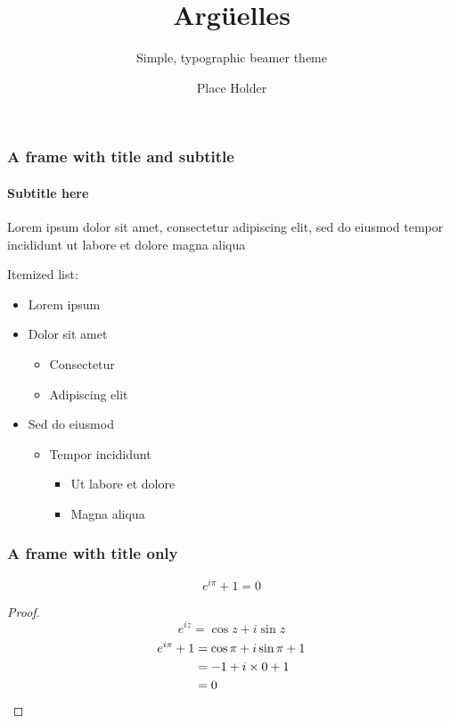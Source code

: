 \documentclass[compress,12pt]{beamer}
\title{Argüelles}
\subtitle{Simple, typographic beamer theme}
\date{}
\author{Place Holder}
\institute{University of \TeX}
\begin{document}
\frame[plain]{\titlepage}


\begin{frame}
 \frametitle{A frame with title and subtitle}
      \framesubtitle{Subtitle here}
      Lorem ipsum dolor sit amet, consectetur adipiscing elit, sed do eiusmod tempor incididunt ut labore et dolore magna aliqua \par
      Itemized list:
 \begin{itemize}
            \item Lorem ipsum
            \item Dolor sit amet
        \begin{itemize}
                        \item Consectetur
                        \item Adipiscing elit
                  \end{itemize}
            \item Sed do eiusmod
               \begin{itemize}
                        \item Tempor incididunt
                              \begin{itemize}
                                    \item Ut labore et dolore
                                    \item Magna aliqua
               \end{itemize}
        \end{itemize}
 \end{itemize}
\end{frame}

\begin{frame}
 \frametitle{A frame with title only}
 \begin{theorem}
  \[e^{i\pi}+1=0\]
  \begin{proof}
   \begin{equation*}
    e^{iz}=\cos{z}+i\sin{z}
   \end{equation*}
   \begin{align*}
    e^{i\pi}+1 & \null=\cos\pi+i\sin\pi+1 \\
               & \null=-1+i\times0+1      \\
               & \null=0                  
   \end{align*}
  \end{proof}
 \end{theorem}
\end{frame}
\end{document}
